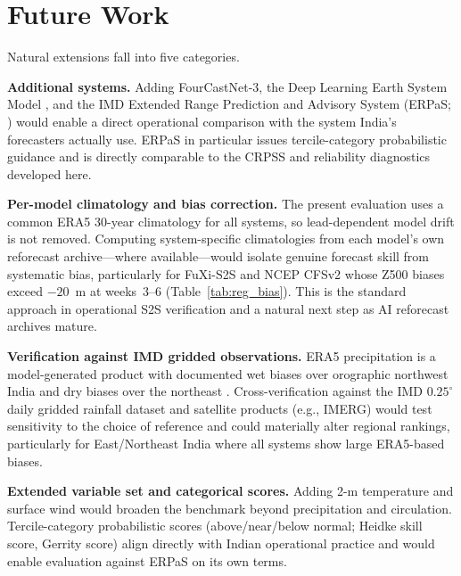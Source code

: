 \documentclass[11pt]{article}
\begin{document}
\section{Future Work}\label{sec:future}

Natural extensions fall into five categories.

\textbf{Additional systems.} Adding FourCastNet-3, the Deep Learning
Earth System Model \citep{cresswellclay2024}, and the IMD Extended
Range Prediction and Advisory System (ERPaS;
\citealt{pattanaik2019}) would enable a direct operational comparison
with the system India's forecasters actually use. ERPaS in particular
issues tercile-category probabilistic guidance and is directly
comparable to the CRPSS and reliability diagnostics developed here.

\textbf{Per-model climatology and bias correction.} The present
evaluation uses a common ERA5 30-year climatology for all systems,
so lead-dependent model drift is not removed. Computing system-specific
climatologies from each model's own reforecast archive---where
available---would isolate genuine forecast skill from systematic bias,
particularly for FuXi-S2S and NCEP CFSv2 whose Z500 biases exceed
$-20$~m at weeks~3--6 (Table~\ref{tab:reg_bias}). This is the standard
approach in operational S2S verification \citep{vitart2017} and a
natural next step as AI reforecast archives mature.

\textbf{Verification against IMD gridded observations.} ERA5
precipitation is a model-generated product with documented wet biases
over orographic northwest India and dry biases over the northeast
\citep{pai2014,hersbach2020}. Cross-verification against the IMD
$0.25^\circ$ daily gridded rainfall dataset \citep{pai2014} and
satellite products (e.g., IMERG) would test sensitivity to the choice
of reference and could materially alter regional rankings, particularly
for East/Northeast India where all systems show large ERA5-based
biases.

\textbf{Extended variable set and categorical scores.}
Adding 2-m temperature and surface wind would broaden the benchmark
beyond precipitation and circulation. Tercile-category probabilistic
scores (above/near/below normal; Heidke skill score, Gerrity score)
align directly with Indian operational practice \citep{pattanaik2019,
wilks2019} and would enable evaluation against ERPaS on its own terms.
\end{document}
